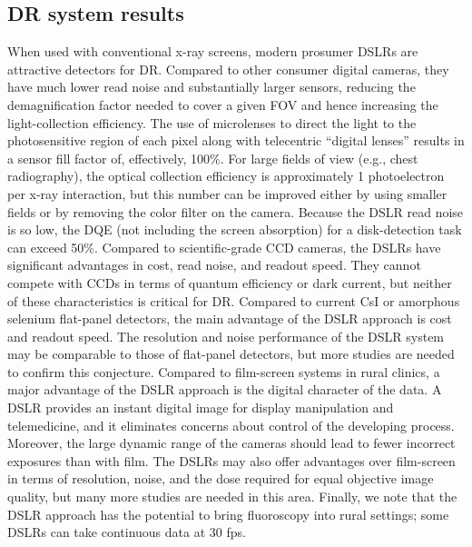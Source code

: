 
\subsection{DR system results}
When used with conventional x-ray screens, modern prosumer DSLRs are attractive detectors for DR.  Compared to other consumer digital cameras, they have much lower read noise and substantially larger sensors, reducing the demagnification factor needed to cover a given FOV and hence increasing the light-collection efficiency.  The use of microlenses to direct the light to the photosensitive region of each pixel along with telecentric ``digital lenses'' results in a sensor fill factor of, effectively, 100\%. For large fields of view (e.g., chest radiography), the optical collection efficiency is approximately 1 photoelectron per x-ray interaction, but this number can be improved either by using smaller fields or by removing the color filter on the camera. Because the DSLR read noise is so low, the DQE (not including the screen absorption) for a disk-detection task can exceed 50\%.  Compared to scientific-grade CCD cameras, the DSLRs have significant advantages in cost, read noise, and readout speed.  They cannot compete with CCDs in terms of quantum efficiency or dark current, but neither of these characteristics is critical for DR.  Compared to current CsI or amorphous selenium flat-panel detectors, the main advantage of the DSLR approach is cost and readout speed. The resolution and noise performance of the DSLR system may be comparable to those of flat-panel detectors, but more studies are needed to confirm this conjecture.  Compared to film-screen systems in rural clinics, a major advantage of the DSLR approach is the digital character of the data. A DSLR provides an instant digital image for display manipulation and telemedicine, and it eliminates concerns about control of the developing process. Moreover, the large dynamic range of the cameras should lead to fewer incorrect exposures than with film. The DSLRs may also offer advantages over film-screen in terms of resolution, noise, and the dose required for equal objective image quality, but many more studies are needed in this area.  Finally, we note that the DSLR approach has the potential to bring fluoroscopy into rural settings; some DSLRs can take continuous data at 30 fps.

